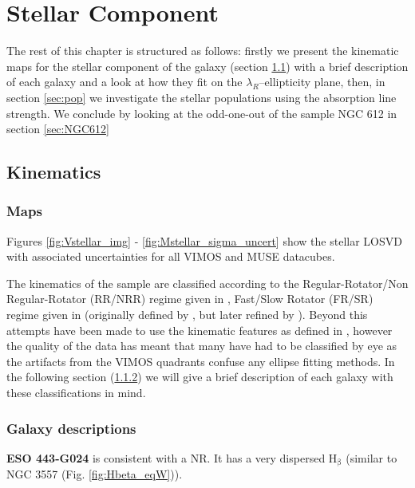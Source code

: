 \chapter{Stellar Component}
	\label{cha:stellar}


The rest of this chapter is structured as follows: firstly we present the kinematic maps for the stellar component of the galaxy (section \ref{sec:stellarKin}) with a brief description of each galaxy and a look at how they fit on the $\lambda_R$--ellipticity plane, then, in section \ref{sec:pop} we investigate the stellar populations using the absorption line strength. We conclude by looking at the odd-one-out of the sample NGC 612 in section \ref{sec:NGC612}

\section{Kinematics}
	\label{sec:stellarKin}

	\subsection{Maps}
		\label{subsec:maps}

		

		Figures \ref{fig:Vstellar_img} - \ref{fig:Mstellar_sigma_uncert} show the stellar LOSVD with associated uncertainties for all VIMOS and MUSE datacubes. 

		The kinematics of the sample are classified according to the Regular-Rotator/Non Regular-Rotator (RR/NRR) regime given in \citet{Krajnovic2011}, Fast/Slow Rotator (FR/SR) regime given in \citet{Cappellari2016} (originally defined by \citet{Emsellem2011}, but later refined by \citet{Cappellari2016}). Beyond this attempts have been made to use the kinematic features as defined in \citet{Krajnovic2011}, however the quality of the data has meant that many have had to be classified by eye as the artifacts from the VIMOS quadrants confuse any ellipse fitting methods. In the following section (\ref{subsec:descriptions}) we will give a brief description of each galaxy with these classifications in mind. 

	\subsection{Galaxy descriptions}
		\label{subsec:descriptions}

		\textbf{ESO 443-G024} is consistent with a NR. It has a very dispersed H$_\mathrm{\beta}$ (similar to NGC 3557 (Fig. \ref{fig:Hbeta_eqW})).

